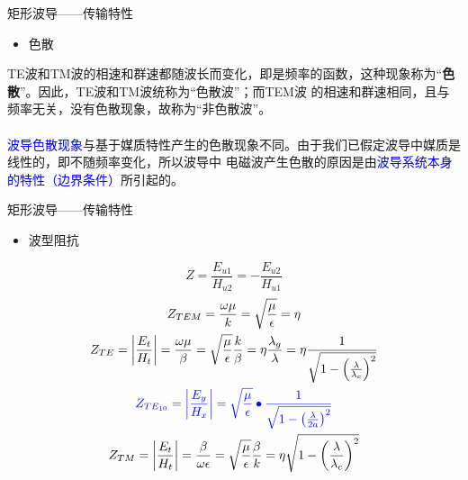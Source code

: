 \begin{frame}{矩形波导——传输特性}
    \begin{itemize}
        \item 色散
    \end{itemize}
    TE波和TM波的相速和群速都随波长而变化，即是频率的函数，这种现象称为“\textbf{色散}”。因此，TE波和TM波统称为“色散波”；而TEM波
    的相速和群速相同，且与频率无关，没有色散现象，故称为“非色散波”。\\
    \hspace*{\fill} \\
    \textcolor{blue}{波导色散现象}与基于媒质特性产生的色散现象不同。由于我们已假定波导中媒质是线性的，即不随频率变化，所以波导中
    电磁波产生色散的原因是由\textcolor{blue}{波导系统本身的特性（边界条件）}所引起的。
\end{frame}

\begin{frame}{矩形波导——传输特性}
    \begin{itemize}
        \item 波型阻抗
    \end{itemize}
    $$Z=\frac{E_{u1}}{H_{u2}}=-\frac{E_{u2}}{H_{u1}}$$
    \begin{gather}
        Z_{TEM}=\frac{\omega\mu}{k}=\sqrt{\frac{\mu}{\epsilon}}=\eta\\
        Z_{TE}=\left|\frac{E_t}{H_t}\right|=\frac{\omega\mu}{\beta}=\sqrt{\frac{\mu}{\epsilon}}\frac{k}{\beta}=\eta\frac{\lambda_g}{\lambda}=\eta\frac{1}{\sqrt{1-\left(\frac{\lambda}{\lambda_c}\right)^2}}\\
        \color{blue}{Z_{TE_{10}}=\left|\frac{E_y}{H_x}\right|=\sqrt{\frac{\mu}{\epsilon}}\bullet\frac{1}{\sqrt{1-\left(\frac{\lambda}{2a}\right)^2}}}\\
        Z_{TM}=\left|\frac{E_t}{H_t}\right|=\frac{\beta}{\omega\epsilon}=\sqrt{\frac{\mu}{\epsilon}}\frac{\beta}{k}=\eta\sqrt{1-\left(\frac{\lambda}{\lambda_c}\right)^2}
    \end{gather}
\end{frame}

